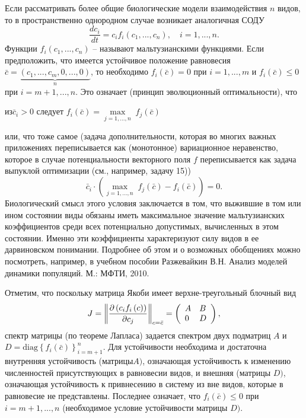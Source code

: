 \begin{remark}
Если рассматривать более общие биологические модели взаимодействия $n$ 
видов, то в пространственно однородном случае возникает аналогичная СОДУ
\[
\frac{dc_i }{dt}=c_i f_i \left( {c_1 ,...,c_n } \right),
\quad
i=1,...,n.
\]
Функции $f_i \left( {c_1 ,...,c_n } \right)$ -- называют мальтузианскими 
функциями. Если предположить, что имеется устойчивое положение равновесия 
$\bar {c}=\underbrace {\left( {c_1 ,...,c_m ,0,...,0} \right)}_n$, 
то необходимо $f_i \left( {\bar {c}} \right)=0$ при $i=1,...,m$ и $f_i 
\left( {\bar {c}} \right)\le 0$ при $i=m+1,...,n$. Это означает (принцип 
эволюционный оптимальности), что
\begin{center}
$из \bar {c}_i >0$ следует $f_i \left( {\bar {c}} \right)=\mathop {\max 
}\limits_{j=1,...,n} \;f_j \left( {\bar {c}} \right)$
\end{center}
или, что тоже самое (задача дополнительности, которая во многих важных 
приложениях переписывается как (монотонное) вариационное 
неравенство, которое в случае потенциальности векторного поля $f$ 
переписывается как задача выпуклой оптимизации (см., например, задачу 15))
\[
\bar {c}_i \cdot \left( {\mathop {\max }\limits_{j=1,...,n} \;f_j \left( 
{\bar {c}} \right)-f_i \left( {\bar {c}} \right)} \right)=0.
\]
Биологический смысл этого условия заключается в том, что выжившие в том или 
ином состоянии виды обязаны иметь максимальное значение мальтузианских 
коэффициентов среди всех потенциально допустимых, вычисленных в этом 
состоянии. Именно эти коэффициенты характеризуют силу видов в ее 
дарвиновском понимании. Подробнее об этом и о возможных обобщениях можно 
посмотреть, например, в учебном пособии  Разжевайкин В.Н. Анализ моделей динамики популяций. 
М.: МФТИ, 2010. 

Отметим, что поскольку матрица Якоби имеет верхне-треугольный блочный 
вид 
$$ J = \left\| {\frac{\partial \left( {c_i f_i \left( c \right)} 
\right)}{\partial c_j }} \right\|_{c=\bar {c}} =\left( 
{{\begin{array}{*{20}c}
 A \hfill & B \hfill \\
 0 \hfill & D \hfill \\
\end{array} }} \right),$$ 
спектр матрицы (по теореме Лапласа) задается 
спектром двух подматриц $A$ и $D=\mbox{diag}\left\{ {f_i \left( {\bar {c}} 
\right)} \right\}_{i=m+1}^n $. Для устойчивости необходима и достаточна 
внутренняя устойчивость (матрицы$A)$, означающая устойчивость к изменению 
численностей присутствующих в равновесии видов, и внешняя (матрицы $D)$, 
означающая устойчивость к привнесению в систему из вне видов, которые в 
равновесие не представлены. Последнее означает, что $f_i \left( {\bar {c}} 
\right)\le 0$ при $i=m+1,...,n$ (необходимое условие устойчивости матрицы 
$D)$.


\end{remark}
